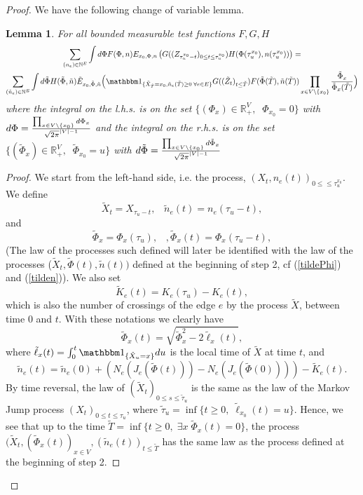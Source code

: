 \documentclass[11pt,a4paper]{amsart}
\numberwithin{equation}{section}
\newtheorem{lemma}[proposition]{Lemma}
\def\R{{\mathbb R}}
\def\N{{\mathbb N}}
\def\indic{{{\mathbbm 1}}}
\begin{document}
\begin{proof}
We have the following change of variable lemma.
\begin{lemma}\label{change-var}
For all bounded measurable test functions $F,G,H$
\begin{multline*}
\sum_{(n_e)\in \N^E} \int d\Phi F(\Phi, n)E_{x_0,\Phi,n}
\left( G((Z_{\tau_u^{x_0}-t})_{0\le t\le\tau_u^{x_0}})
H(\Phi(\tau_u^{x_0}), n(\tau_u^{x_0}))\right)=
\\
\sum_{(\tilde n_e)\in \N^E} \int d\tilde\Phi H(\tilde\Phi, \tilde n)
\tilde E_{x_0,\tilde \Phi,\tilde n}
\Big(\indic_{\{\tilde X_{\tilde T}=x_0,\tilde n_e(\tilde T)\ge 0\; \forall e\in E\}} 
G((\tilde Z_{t})_{t\le\check T})
F(\tilde\Phi(\tilde T), \tilde n(\tilde T))\prod_{x\in V\setminus\{x_0\}} {\tilde \Phi_x\over \tilde\Phi_x(\tilde T) }\Big)
\end{multline*}
where the integral on the l.h.s. is on the set $\{(\Phi_x)\in \R_+^V, \;\; \Phi_{x_0}=0\}$ with $d\Phi= {\prod_{x\in V\setminus\{x_0\}} d\Phi_x\over \sqrt{2\pi}^{\vert V\vert -1}}$
and the integral on the r.h.s. is on the set $\{(\tilde\Phi_x)\in \R_+^V, \;\; \tilde\Phi_{x_0}=u\}$ with 
$d\tilde\Phi= {\prod_{x\in V\setminus\{x_0\}} d\tilde\Phi_x\over \sqrt{2\pi}^{\vert V\vert -1}}$
\end{lemma}
\begin{proof} 
We start from the left-hand side, i.e. the process, $(X_t, n_e(t))_{0\le\le \tau_u^{x_0}}$.
We define
$$
\tilde X_{t}=X_{\tau_u-t},\;\;\; \tilde n_e(t)=n_e(\tau_u-t),
$$
and
$$
\tilde \Phi_x=\Phi_x(\tau_u),\;\;\;, \tilde\Phi_x(t)=\Phi_x({\tau_u-t}), 
$$
(The law of the processes such defined will later be identified with the law of the processes ($\tilde X_t, \tilde \Phi(t),\tilde n(t))$ defined at the beginning of step 2, cf (\ref{tildePhi}) and (\ref{tilden})).
We also set
$$
\tilde K_e(t)= K_e(\tau_u)-K_e(t),
$$
which is also the number of crossings of the edge $e$ by the process $\tilde X$, between time 0 and $t$. With these notations we clearly have
$$
\tilde \Phi_x(t)=\sqrt{\tilde \Phi_x^2-2\tilde \ell_x(t)},
$$
where $\tilde \ell_x(t)=\int_{0}^t\indic_{\{\tilde X_u=x\}} du$ is the local time of $\tilde X$ at time $t$, and
$$
\tilde n_e(t)= \tilde n_e(0)+(N_e(J_e(\tilde \Phi(t)))-N_e(J_e(\tilde\Phi(0))))-\tilde K_e(t).
$$
By time reversal, the law of $(\tilde X_t)_{0\le s\le \tilde \tau_u}$ is the same as the law of the Markov Jump process $(X_t)_{0\le t\le \tau_u}$, where
$\tilde \tau_u=\inf\{t\ge 0, \; \tilde\ell_{x_0}(t)=u\}$. Hence, we see that up to the time $\tilde T=\inf\{t\ge 0, \; \exists x\; \tilde\Phi_x(t)=0\}$, the process
$(\tilde X_t, (\tilde \Phi_x(t))_{x\in V}, (\tilde n_e(t))_{t\le \tilde T}$ has the same law as the process defined at the beginning of step 2.


\end{proof}
\end{proof}
\end{document}
